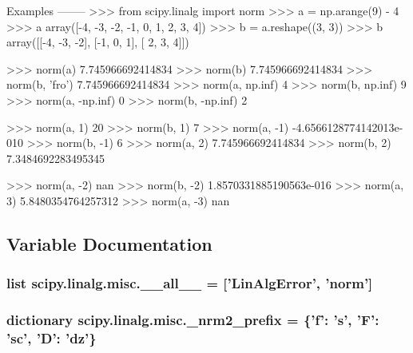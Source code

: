 \begin{DoxyVerb}
Examples
--------
>>> from scipy.linalg import norm
>>> a = np.arange(9) - 4
>>> a
array([-4, -3, -2, -1,  0,  1,  2,  3,  4])
>>> b = a.reshape((3, 3))
>>> b
array([[-4, -3, -2],
       [-1,  0,  1],
       [ 2,  3,  4]])

>>> norm(a)
7.745966692414834
>>> norm(b)
7.745966692414834
>>> norm(b, 'fro')
7.745966692414834
>>> norm(a, np.inf)
4
>>> norm(b, np.inf)
9
>>> norm(a, -np.inf)
0
>>> norm(b, -np.inf)
2

>>> norm(a, 1)
20
>>> norm(b, 1)
7
>>> norm(a, -1)
-4.6566128774142013e-010
>>> norm(b, -1)
6
>>> norm(a, 2)
7.745966692414834
>>> norm(b, 2)
7.3484692283495345

>>> norm(a, -2)
nan
>>> norm(b, -2)
1.8570331885190563e-016
>>> norm(a, 3)
5.8480354764257312
>>> norm(a, -3)
nan\end{DoxyVerb}
 

\subsection{Variable Documentation}
\hypertarget{namespacescipy_1_1linalg_1_1misc_a71866d9c3fe8f2d50e79819bde1da3fe}{}
\subsubsection[{\+\_\+\+\_\+all\+\_\+\+\_\+}]{\setlength{\rightskip}{0pt plus 5cm}list scipy.\+linalg.\+misc.\+\_\+\+\_\+all\+\_\+\+\_\+ = \mbox{[}'Lin\+Alg\+Error', '{\bf norm}'\mbox{]}}\label{namespacescipy_1_1linalg_1_1misc_a71866d9c3fe8f2d50e79819bde1da3fe}
\hypertarget{namespacescipy_1_1linalg_1_1misc_aec5db2f7ab880edacfa07edc1a9d0075}{}
\subsubsection[{\+\_\+nrm2\+\_\+prefix}]{\setlength{\rightskip}{0pt plus 5cm}dictionary scipy.\+linalg.\+misc.\+\_\+nrm2\+\_\+prefix = \{'f'\+: '{\bf s}', 'F'\+: 'sc', '{\bf D}'\+: 'dz'\}}\label{namespacescipy_1_1linalg_1_1misc_aec5db2f7ab880edacfa07edc1a9d0075}
